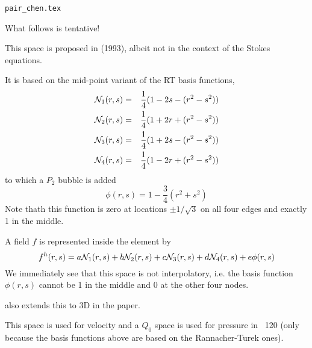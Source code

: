 \begin{flushright} {\tiny {\color{gray} \tt pair\_chen.tex}} \end{flushright}

What follows is tentative!

This space is proposed in \textcite{chen93b} (1993), albeit not in the 
context of the Stokes equations.

It is based on the mid-point variant of the RT basis functions, 
\begin{eqnarray}
{\mathcal{N}}_1(r,s) &=& \frac{1}{4} (1-2s-(r^2-s^2)) \nonumber\\
{\mathcal{N}}_2(r,s) &=& \frac{1}{4} (1+2r+(r^2-s^2)) \nonumber\\
{\mathcal{N}}_3(r,s) &=& \frac{1}{4} (1+2s-(r^2-s^2)) \nonumber\\
{\mathcal{N}}_4(r,s) &=& \frac{1}{4} (1-2r+(r^2-s^2)) \nonumber
\end{eqnarray}
to which a $P_2$ bubble is added
\[
\phi(r,s) = 1-\frac34(r^2+s^2)
\]
Note thath this function is zero at locations $\pm 1/\sqrt{3}$ 
on all four edges and exactly 1 in the middle. 

A field $f$ is represented inside the element by 
\[
f^h(r,s)=a {\mathcal{N}}_1(r,s)
+b {\mathcal{N}}_2(r,s)
+c {\mathcal{N}}_3(r,s)
+d {\mathcal{N}}_4(r,s)
+e \phi(r,s)
\]
We immediately see that this space is not interpolatory, i.e. the basis function $\phi(r,s)$ cannot be 1 in the middle and 0 at the other four nodes. 

\textcite{chen} also extends this to 3D in the paper. 

This space is used for velocity and a $Q_0$ space is used for 
pressure in \stone~120 (only because the basis functions above are
based on the Rannacher-Turek ones).
